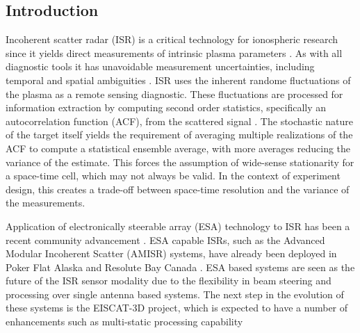 \documentclass[draft,ras]{agutex}
\begin{document}
%
%

%

\begin{article}

\section{Introduction}
Incoherent scatter radar (ISR) is a critical technology for ionospheric research since it yields direct measurements of intrinsic plasma parameters  \citep{dougherty:farley1960, farleydougherty:ISR2, doughteryfarley:ISR3, hagfors1961}. As with all diagnostic tools it has unavoidable measurement uncertainties, including temporal and spatial ambiguities \citep{farley1969,farleycomppower1969,Woodman:1991is,hysell2008,RDS:RDS20236}.  ISR uses the inherent randome fluctuations of the plasma as a remote sensing diagnostic. These fluctuations are processed for information extraction by computing second order statistics, specifically an autocorrelation function (ACF), from the scattered signal \citep{farley1969}. The stochastic nature of the target itself yields the requirement of averaging multiple realizations of the ACF to compute a statistical ensemble average, with more averages reducing the variance of the estimate. This forces the assumption of wide-sense stationarity for a space-time cell, which may not always be valid. In the context of experiment design, this creates a trade-off between space-time resolution and the variance of the measurements.

Application of electronically steerable array (ESA) technology to ISR has been a recent community advancement \citep{kelly:pfisr2009}. ESA capable ISRs, such as the Advanced Modular Incoherent Scatter (AMISR) systems, have already been deployed in Poker Flat Alaska and Resolute Bay Canada \citep{Nicolls:2007ie, dahlgren2012di}. ESA based systems are seen as the future of the ISR sensor modality due to the flexibility in beam steering and processing over single antenna based systems. The next step in the evolution of these systems is the EISCAT-3D project, which is expected to have a number of enhancements such as multi-static processing capability \citep{turunen:eiscat3d2009}


\end{article}
\end{document}

